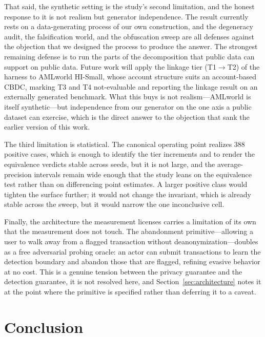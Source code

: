 \documentclass[11pt]{article}
\begin{document}
That said, the synthetic setting is the study's second limitation, and the honest response to it is
not realism but generator independence. The result currently rests on a data-generating process of
our own construction, and the degeneracy audit, the falsification world, and the obfuscation sweep
are all defenses against the objection that we designed the process to produce the answer. The
strongest remaining defense is to run the parts of the decomposition that public data can support on
public data. Future work will apply the linkage tier (T1$\to$T2) of the harness to AMLworld HI-Small,
whose account structure suits an account-based CBDC, marking T3 and T4 not-evaluable and reporting the
linkage result on an externally generated benchmark. What this buys is not realism---AMLworld is
itself synthetic---but independence from our generator on the one axis a public dataset can exercise,
which is the direct answer to the objection that sank the earlier version of this work.

The third limitation is statistical. The canonical operating point realizes 388 positive cases, which
is enough to identify the tier increments and to render the equivalence verdicts stable across seeds,
but it is not large, and the average-precision intervals remain wide enough that the study leans on
the equivalence test rather than on differencing point estimates. A larger positive class would
tighten the surface further; it would not change the invariant, which is already stable across the
sweep, but it would narrow the one inconclusive cell.

Finally, the architecture the measurement licenses carries a limitation of its own that the
measurement does not touch. The abandonment primitive---allowing a user to walk away from a flagged
transaction without deanonymization---doubles as a free adversarial probing oracle: an actor can
submit transactions to learn the detection boundary and abandon those that are flagged, refining
evasive behavior at no cost. This is a genuine tension between the privacy guarantee and the
detection guarantee, it is not resolved here, and Section~\ref{sec:architecture} notes it at the point
where the primitive is specified rather than deferring it to a caveat.


\section{Conclusion}
\label{sec:conclusion}
\end{document}
